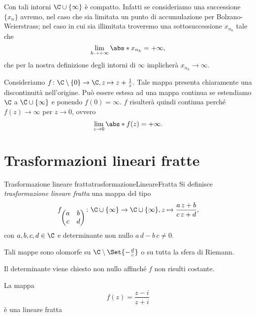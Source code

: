 \begin{oss}
	Con tali intorni \(\C\cup\{\infty\}\) è compatto.
	Infatti se consideriamo una successione \(\{x_n\}\) avremo, nel caso che sia limitata un punto di accumulazione per Bolzano-Weierstrass; nel caso in cui sia illimitata troveremo una sottosuccessione \(x_{n_h}\) tale che
	\[
		\lim_{h\to +\infty} \abs*{x_{n_h}} = +\infty,
	\]
	che per la nostra definizione degli intorni di \(\infty\) implicherà \(x_{n_h} \to \infty\).
\end{oss}

\begin{ese}
	Consideriamo \(f\colon \C\setminus\{0\} \to \C, z \mapsto z + \frac{1}{z}\).
	Tale mappa presenta chiaramente una discontinuità nell'origine.
	Può essere estesa ad una mappa continua se estendiamo \(\C\) a \(\C\cup \{\infty\}\) e ponendo \(f(0)=\infty\).
	\(f\) risulterà quindi continua perché \(f(z) \to \infty\) per \(z\to 0\), ovvero
	\[
		\lim_{z\to 0} \abs*{f(z)} = +\infty.
	\]
\end{ese}
\section{Trasformazioni lineari fratte}

\begin{defn}{Trasformazione lineare fratta}{trasformazioneLineareFratta}
	Si definisce \emph{trasformazione lineare fratta} una mappa del tipo
	\[
		f_{\begin{pmatrix}a & b\\c & d\end{pmatrix}}\colon \C\cup\{\infty\} \to \C\cup\{\infty\}, z\mapsto \frac{a\,z+b}{c\,z+d},
	\]
	con \(a,b,c,d\in \C\) e determinante non nullo \(a\,d-b\,c \neq 0\).
\end{defn}

\begin{oss}
	Tali mappe sono olomorfe su \(\C\setminus\Set{-\frac{d}{c}}\) o su tutta la sfera di Riemann.
\end{oss}

\begin{oss}
	Il determinante viene chiesto non nullo affinché \(f\) non risulti costante.
\end{oss}

\begin{ese}
	La mappa
	\[
		f(z) = \frac{z-i}{z+i}
	\]
	è una lineare fratta
\end{ese}

